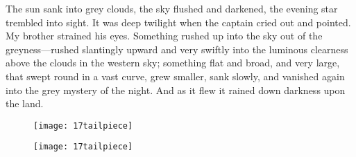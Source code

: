 The sun sank into grey clouds, the sky flushed and darkened, the evening star trembled into sight. It was deep twilight when the captain cried out and pointed. My brother strained his eyes. Something rushed up into the sky out of the greyness—rushed slantingly upward and very swiftly into the luminous clearness above the clouds in the western sky; something flat and broad, and very large, that swept round in a vast curve, grew smaller, sank slowly, and vanished again into the grey mystery of the night. And as it flew it rained down darkness upon the land.


\begin{a4}
	\begin{figure}[b!]
		\centering
		\texttt{[image: 17tailpiece]}
	\end{figure}
\end{a4}

\begin{letter}
	\begin{figure}[b!]
		\centering
		\texttt{[image: 17tailpiece]}
	\end{figure}
\end{letter}




